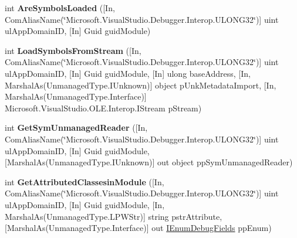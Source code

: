 \begin{DoxyCompactItemize}
\item 
\hypertarget{interface_microsoft_1_1_visual_studio_1_1_debugger_1_1_interop_e_e_1_1_i_debug_com_plus_symbol_provider_a5dfb1861c509595b9508c24e6a874e8e}{int {\bfseries Are\+Symbols\+Loaded} (\mbox{[}In, Com\+Alias\+Name(\char`\"{}Microsoft.\+Visual\+Studio.\+Debugger.\+Interop.\+U\+L\+O\+N\+G32\char`\"{})\mbox{]} uint ul\+App\+Domain\+I\+D, \mbox{[}In\mbox{]} Guid guid\+Module)}\label{interface_microsoft_1_1_visual_studio_1_1_debugger_1_1_interop_e_e_1_1_i_debug_com_plus_symbol_provider_a5dfb1861c509595b9508c24e6a874e8e}

\item 
\hypertarget{interface_microsoft_1_1_visual_studio_1_1_debugger_1_1_interop_e_e_1_1_i_debug_com_plus_symbol_provider_a723c66c20347dacb158b1c927a498877}{int {\bfseries Load\+Symbols\+From\+Stream} (\mbox{[}In, Com\+Alias\+Name(\char`\"{}Microsoft.\+Visual\+Studio.\+Debugger.\+Interop.\+U\+L\+O\+N\+G32\char`\"{})\mbox{]} uint ul\+App\+Domain\+I\+D, \mbox{[}In\mbox{]} Guid guid\+Module, \mbox{[}In\mbox{]} ulong base\+Address, \mbox{[}In, Marshal\+As(Unmanaged\+Type.\+I\+Unknown)\mbox{]} object p\+Unk\+Metadata\+Import, \mbox{[}In, Marshal\+As(Unmanaged\+Type.\+Interface)\mbox{]} Microsoft.\+Visual\+Studio.\+O\+L\+E.\+Interop.\+I\+Stream p\+Stream)}\label{interface_microsoft_1_1_visual_studio_1_1_debugger_1_1_interop_e_e_1_1_i_debug_com_plus_symbol_provider_a723c66c20347dacb158b1c927a498877}

\item 
\hypertarget{interface_microsoft_1_1_visual_studio_1_1_debugger_1_1_interop_e_e_1_1_i_debug_com_plus_symbol_provider_a5a77ed7b94ddcc5fb91611dbf13a5af6}{int {\bfseries Get\+Sym\+Unmanaged\+Reader} (\mbox{[}In, Com\+Alias\+Name(\char`\"{}Microsoft.\+Visual\+Studio.\+Debugger.\+Interop.\+U\+L\+O\+N\+G32\char`\"{})\mbox{]} uint ul\+App\+Domain\+I\+D, \mbox{[}In\mbox{]} Guid guid\+Module, \mbox{[}Marshal\+As(Unmanaged\+Type.\+I\+Unknown)\mbox{]} out object pp\+Sym\+Unmanaged\+Reader)}\label{interface_microsoft_1_1_visual_studio_1_1_debugger_1_1_interop_e_e_1_1_i_debug_com_plus_symbol_provider_a5a77ed7b94ddcc5fb91611dbf13a5af6}

\item 
\hypertarget{interface_microsoft_1_1_visual_studio_1_1_debugger_1_1_interop_e_e_1_1_i_debug_com_plus_symbol_provider_a158c4ecd4ac2cc39be1dcd4043a016c4}{int {\bfseries Get\+Attributed\+Classesin\+Module} (\mbox{[}In, Com\+Alias\+Name(\char`\"{}Microsoft.\+Visual\+Studio.\+Debugger.\+Interop.\+U\+L\+O\+N\+G32\char`\"{})\mbox{]} uint ul\+App\+Domain\+I\+D, \mbox{[}In\mbox{]} Guid guid\+Module, \mbox{[}In, Marshal\+As(Unmanaged\+Type.\+L\+P\+W\+Str)\mbox{]} string pstr\+Attribute, \mbox{[}Marshal\+As(Unmanaged\+Type.\+Interface)\mbox{]} out \hyperlink{interface_microsoft_1_1_visual_studio_1_1_debugger_1_1_interop_e_e_1_1_i_enum_debug_fields}{I\+Enum\+Debug\+Fields} pp\+Enum)}\label{interface_microsoft_1_1_visual_studio_1_1_debugger_1_1_interop_e_e_1_1_i_debug_com_plus_symbol_provider_a158c4ecd4ac2cc39be1dcd4043a016c4}


\end{DoxyCompactItemize}
